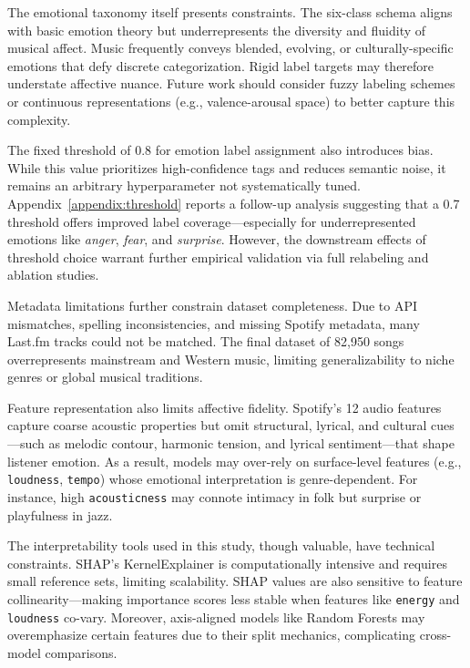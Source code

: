 \documentclass{article}
\begin{document}
The emotional taxonomy itself presents constraints. The six-class schema aligns with basic emotion theory but underrepresents the diversity and fluidity of musical affect. Music frequently conveys blended, evolving, or culturally-specific emotions that defy discrete categorization. Rigid label targets may therefore understate affective nuance. Future work should consider fuzzy labeling schemes or continuous representations (e.g., valence-arousal space) to better capture this complexity.

The fixed threshold of 0.8 for emotion label assignment also introduces bias. While this value prioritizes high-confidence tags and reduces semantic noise, it remains an arbitrary hyperparameter not systematically tuned. Appendix~\ref{appendix:threshold} reports a follow-up analysis suggesting that a 0.7 threshold offers improved label coverage—especially for underrepresented emotions like \textit{anger}, \textit{fear}, and \textit{surprise}. However, the downstream effects of threshold choice warrant further empirical validation via full relabeling and ablation studies.

Metadata limitations further constrain dataset completeness. Due to API mismatches, spelling inconsistencies, and missing Spotify metadata, many Last.fm tracks could not be matched. The final dataset of 82,950 songs overrepresents mainstream and Western music, limiting generalizability to niche genres or global musical traditions.

Feature representation also limits affective fidelity. Spotify’s 12 audio features capture coarse acoustic properties but omit structural, lyrical, and cultural cues—such as melodic contour, harmonic tension, and lyrical sentiment—that shape listener emotion. As a result, models may over-rely on surface-level features (e.g., \texttt{loudness}, \texttt{tempo}) whose emotional interpretation is genre-dependent. For instance, high \texttt{acousticness} may connote intimacy in folk but surprise or playfulness in jazz.

The interpretability tools used in this study, though valuable, have technical constraints. SHAP’s KernelExplainer is computationally intensive and requires small reference sets, limiting scalability. SHAP values are also sensitive to feature collinearity—making importance scores less stable when features like \texttt{energy} and \texttt{loudness} co-vary. Moreover, axis-aligned models like Random Forests may overemphasize certain features due to their split mechanics, complicating cross-model comparisons.
\end{document}
